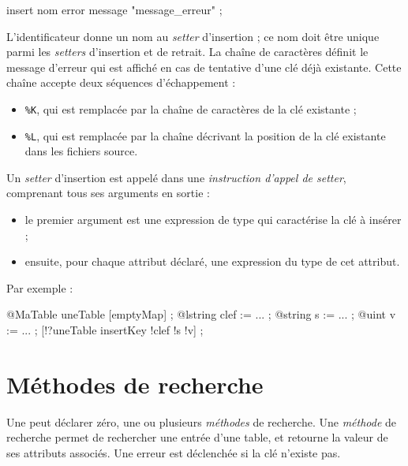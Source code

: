 \begin{galgascode}
insert nom error message "message_erreur" ;
\end{galgascode}

L'identificateur  donne un nom au \emph{setter} d'insertion ; ce nom doit être unique parmi les \emph{setters} d'insertion et de retrait. La chaîne de caractères  définit le message d'erreur qui est affiché en cas de tentative d'une clé déjà existante. Cette chaîne accepte deux séquences d'échappement :
\begin{itemize}
  \item \colorbox{\couleurCodeGALGAS}{\texttt{\%K}}, qui est remplacée par la chaîne de caractères de la clé existante ;
  \item \colorbox{\couleurCodeGALGAS}{\texttt{\%L}}, qui est remplacée par la chaîne décrivant la position de la clé existante dans les fichiers source.
\end{itemize}


Un \emph{setter} d'insertion est appelé dans une \emph{instruction d'appel de setter}, comprenant tous ses arguments en sortie :
\begin{itemize}
  \item le premier argument est une expression de type  qui caractérise la clé à insérer ;
  \item ensuite, pour chaque attribut déclaré, une expression du type de cet attribut.
\end{itemize}

Par exemple :
\begin{galgascode}
@MaTable uneTable [emptyMap] ;
@lstring clef := ... ;
@string s := ... ;
@uint v := ... ;
[!?uneTable insertKey !clef !s !v] ;
\end{galgascode}











\section{Méthodes de recherche}

Une  peut déclarer zéro, une ou plusieurs \emph{méthodes} de recherche. Une \emph{méthode} de recherche permet de rechercher une entrée d'une table, et retourne la valeur de ses attributs associés. Une erreur est déclenchée si la clé n'existe pas.



